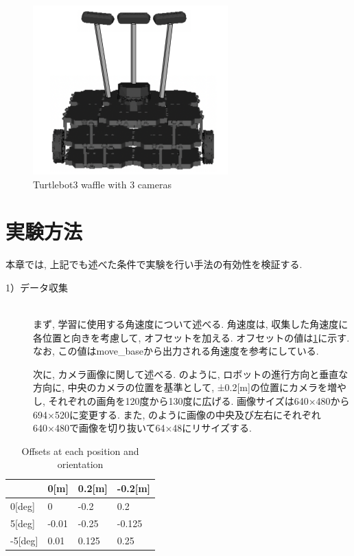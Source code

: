 \begin{figure}[h]
  \centering
  \includegraphics[keepaspectratio, scale=0.5]{images/turtlebot3.png}
  \caption{Turtlebot3 waffle with 3 cameras}
  \label{Fig:turtlebot3_3cam}
\end{figure}

\section{実験方法}
本章では, 上記でも述べた条件で実験を行い手法の有効性を検証する. 

\begin{description}
  \item[1）データ収集]\mbox{}\\ \hspace*{3mm}まず, 学習に使用する角速度について述べる. 角速度は, 収集した角速度に各位置と向きを考慮して, オフセットを加える. オフセットの値は\ref{tb:offset}に示す. なお, この値はmove\_baseから出力される角速度を参考にしている. \par \hspace*{3mm}次に, カメラ画像に関して述べる. のように, ロボットの進行方向と垂直な方向に, 中央のカメラの位置を基準として, ±0.2[m]の位置にカメラを増やし, それぞれの画角を120度から130度に広げる. 画像サイズは640×480から694×520に変更する. また, のように画像の中央及び左右にそれぞれ640×480で画像を切り抜いて64×48にリサイズする. 
\end{description}

\begin{table}[h]
  \centering
  \caption{Offsets at each position and orientation}
  \begin{tabular}{|p{2cm}|p{2cm}|p{2cm}|p{2cm}|} \hline
      & 0[m] & 0.2[m] & -0.2[m] \\ \hline
    0[deg] & 0 & -0.2 & 0.2 \\ \hline
    5[deg] & -0.01 & -0.25 & -0.125 \\ \hline
    -5[deg] & 0.01 & 0.125 & 0.25 \\ \hline
  \end{tabular}
  \label{tb:offset}
\end{table}

